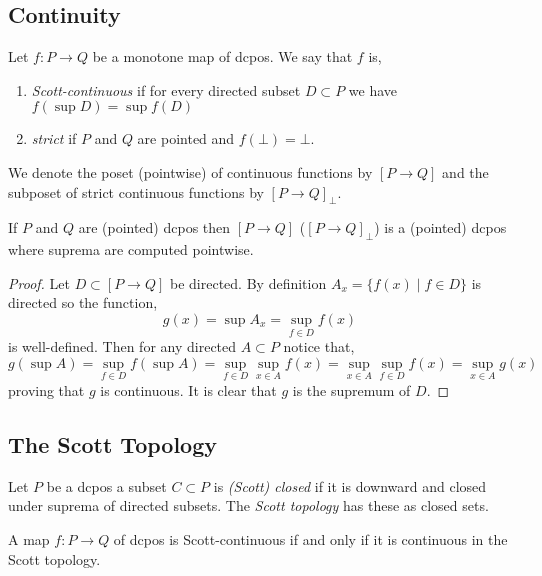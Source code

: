 \documentclass[12pt]{article}
\begin{document}
\subsection{Continuity}

\begin{defn}
Let $f : P \to Q$ be a monotone map of dcpos. We say that $f$ is,
\begin{enumerate}
\item \textit{Scott-continuous} if for every directed subset $D \subset P$ we have $f(\sup D) = \sup f(D)$
\item \textit{strict} if $P$ and $Q$ are pointed and $f(\bot) = \bot$.
\end{enumerate}
We denote the poset (pointwise) of continuous functions by $[P \to Q]$ and the subposet of strict continuous functions by $[P \to Q]_{\bot}$.
\end{defn}

\begin{prop}
If $P$ and $Q$ are (pointed) dcpos then $[P \to Q]$ ($[P \to Q]_{\bot}$) is a (pointed) dcpos where suprema are computed pointwise. 
\end{prop}

\begin{proof}
Let $D \subset [P \to Q]$ be directed. By definition $A_x = \{ f(x) \mid f \in D \}$ is directed so the function,
\[ g(x) = \sup A_x = \sup_{f \in D} f(x) \]
is well-defined. Then for any directed $A \subset P$ notice that,
\[ g(\sup A) = \sup_{f \in D} f(\sup A) = \sup_{f \in D} \sup_{x \in A} f(x) = \sup_{x \in A} \sup_{f \in D} f(x) = \sup_{x \in A} g(x) \]
proving that $g$ is continuous. It is clear that $g$ is the supremum of $D$. 
\end{proof}

\subsection{The Scott Topology}

\begin{defn}
Let $P$ be a dcpos a subset $C \subset P$ is \textit{(Scott) closed} if it is downward and closed under suprema of directed subsets. The \textit{Scott topology} has these as closed sets.  
\end{defn}

\begin{prop}
A map $f : P \to Q$ of dcpos is Scott-continuous if and only if it is continuous in the Scott topology.  
\end{prop}
\end{document}
